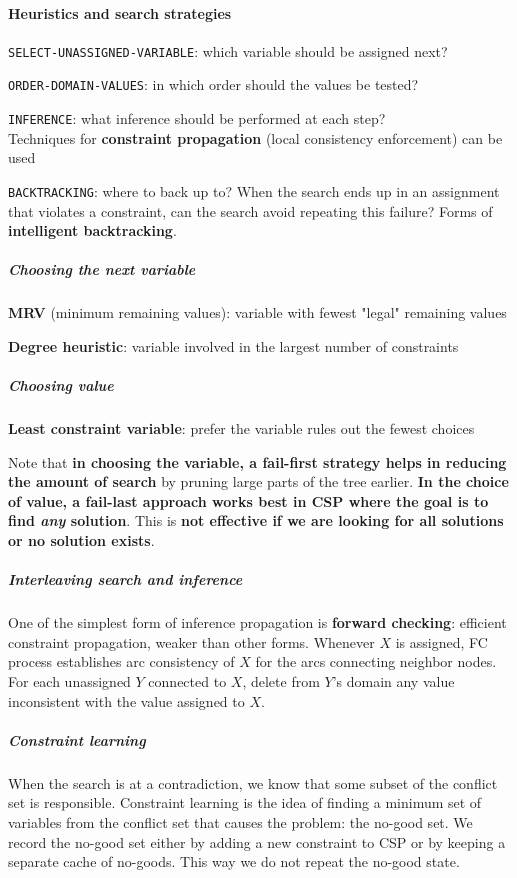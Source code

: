 \documentclass[10pt]{report}
\begin{document}
\paragraph{Heuristics and search strategies}
\begin{list}{}{}
	\item \texttt{SELECT-UNASSIGNED-VARIABLE}: which variable should be assigned next?
	\item \texttt{ORDER-DOMAIN-VALUES}: in which order should the values be tested?
	\item \texttt{INFERENCE}: what inference should be performed at each step?\\
	Techniques for \textbf{constraint propagation} (local consistency enforcement) can be used
	\item \texttt{BACKTRACKING}: where to back up to? When the search ends up in an assignment that violates a constraint, can the search avoid repeating this failure? Forms of \textbf{intelligent backtracking}.
\end{list}
\subparagraph{Choosing the next variable}\begin{list}{}{}
	\item \textbf{MRV} (minimum remaining values): variable with fewest "legal" remaining values
	\item \textbf{Degree heuristic}: variable involved in the largest number of constraints
\end{list}
\subparagraph{Choosing value} \begin{list}{}{}
	\item \textbf{Least constraint variable}: prefer the variable rules out the fewest choices
\end{list}
Note that \textbf{in choosing the variable, a fail-first strategy helps in reducing the amount of search} by pruning large parts of the tree earlier. \textbf{In the choice of value, a fail-last approach works best in CSP where the goal is to find \textit{any} solution}. This is \textbf{not effective if we are looking for all solutions or no solution exists}.
\subparagraph{Interleaving search and inference} One of the simplest form of inference propagation is \textbf{forward checking}: efficient constraint propagation, weaker than other forms. Whenever $X$ is assigned, FC process establishes arc consistency of $X$ for the arcs connecting neighbor nodes. For each unassigned $Y$ connected to $X$, delete from $Y$'s domain any value inconsistent with the value assigned to $X$.
\subparagraph{Constraint learning} When the search is at a contradiction, we know that some subset of the conflict set is responsible. Constraint learning is the idea of finding a minimum set of variables from the conflict set that causes the problem: the no-good set. We record the no-good set either by adding a new constraint to CSP or by keeping a separate cache of no-goods. This way we do not repeat the no-good state.
\end{document}
